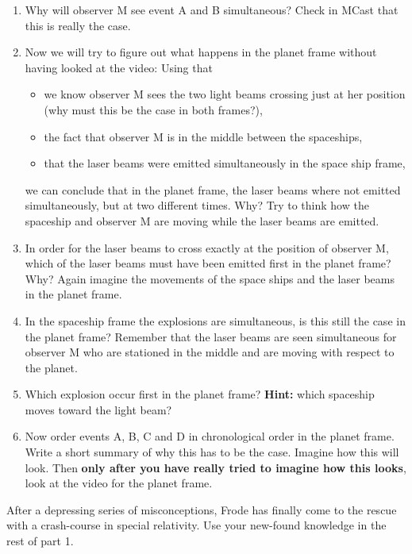 {\begin{multicols}{2}
\begin{enumerate}
\item Why will observer M see event A and B simultaneous? Check in MCast that this is really the case.

\item Now we will try to figure out what happens in the planet frame
without having looked at the video: Using that
\begin{itemize}
\item we know observer M sees the two light beams crossing
 just at her position (why must this be the case in both frames?),
\item  the fact that observer M is in the middle between the spaceships,
\item  that the laser beams were emitted simultaneously in the space
ship frame, 
\end{itemize}
we can conclude that in the planet frame, the laser beams where not
emitted simultaneously, but at two different times. Why?
Try to think how the spaceship and observer M are moving while the
laser beams are emitted.

\item In order for the laser beams to cross exactly at the position of observer
M, which of the laser beams must have been emitted first in the planet
frame? Why? Again imagine the movements of the space ships and the
laser beams in the planet frame.

\item In the spaceship frame the explosions are simultaneous, is this still the case in the planet frame? Remember that the laser beams are seen simultaneous for observer M who are stationed in the middle and are moving with respect to the planet.

\item Which explosion occur first in the planet frame? \textbf{Hint:} which spaceship moves toward the light beam?

\item Now order events A, B, C and D in chronological order in the
planet frame. Write a short summary of why this has to be the case. 
Imagine how this will look. Then {\bf only after you
have really tried to imagine how this looks}, look at the video for
the planet frame.
\end{enumerate}
After a depressing series of misconceptions, Frode has finally come to the rescue with a crash-course in special relativity. Use your new-found knowledge in the rest of part 1. 
\begin{enumerate}
\setcounter{enumi}{6}


\end{enumerate}
\end{multicols}}
